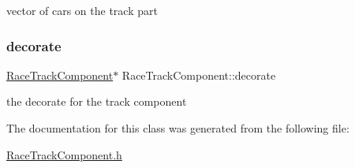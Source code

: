 vector of cars on the track part \mbox{\label{class_race_track_component_ad5b40b7d85b7369e1aaf5ce8c3448128}} 
\subsubsection{\texorpdfstring{decorate}{decorate}}
{\footnotesize\ttfamily \mbox{\hyperlink{class_race_track_component}{Race\+Track\+Component}}$\ast$ Race\+Track\+Component\+::decorate}

the decorate for the track component 

The documentation for this class was generated from the following file\+:\begin{DoxyCompactItemize}
\item 
\mbox{\hyperlink{_race_track_component_8h}{Race\+Track\+Component.\+h}}\end{DoxyCompactItemize}
